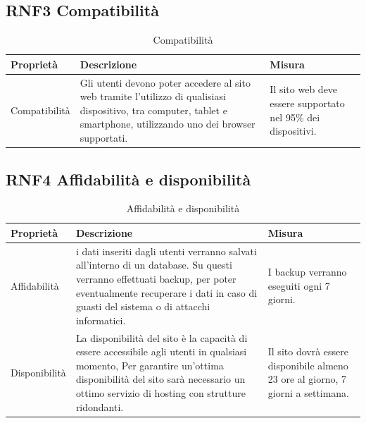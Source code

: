 \documentclass[a4paper,12pt]{article}
\begin{document}
\subsection*{RNF3 Compatibilità}
\begin{table}[H]
    \centering
    \begin{tabular}{|p{}|p{}|p{}|}
        
         \hline  
         Proprietà & Descrizione & Misura\\
         \hline
         Compatibilità
         & Gli utenti devono poter accedere al sito web tramite l'utilizzo di qualisiasi dispositivo,  tra computer, tablet e smartphone, utilizzando uno dei browser supportati.
         & Il sito web deve essere supportato nel 95\% dei dispositivi.\\ \hline
    \end{tabular}
    
    \caption{Compatibilità}
\end{table}


\subsection*{RNF4 Affidabilità e disponibilità}
\begin{table}[H]
    \centering
    \begin{tabular}{|p{}|p{}|p{}|}
         \hline  
         Proprietà & Descrizione & Misura\\
         \hline 
            Affidabilità
         &  i dati inseriti dagli utenti verranno salvati all’interno di un database. Su questi verranno effettuati backup, per poter eventualmente recuperare i dati in caso di guasti del sistema o di attacchi informatici.
         & I backup verranno eseguiti ogni 7 giorni.\\ \hline
         Disponibilità & La disponibilità del sito è la capacità di essere accessibile agli utenti in qualsiasi momento, Per garantire un'ottima disponibilità del sito sarà necessario un ottimo servizio di hosting con strutture ridondanti. & Il sito dovrà essere disponibile almeno 23 ore al giorno, 7 giorni a settimana. \\ \hline
    \end{tabular}
    \caption{Affidabilità e disponibilità}
\end{table}
\end{document}
